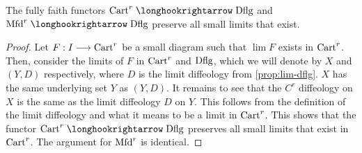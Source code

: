 \documentclass[11pt]{amsart}
\begin{document}
\begin{prop}\label{prop:lim-pres-Cr-Mfdr-Dflg}
The fully faith functors $\Cart^r \hto \Dflg$ and $\Mfd^r \hto \Dflg$
preserve all small limits that exist.
\end{prop}
\begin{proof}
Let $F : I \to \Cart^r$ be a small diagram such that $\lim F$ exists in $\mathrm{Cart}^r$.
Then, consider the limits of $F$ in $\mathrm{Cart}^r$ and $\mathrm{Dflg}$, which we will denote by
$X$ and $(Y, D)$ respectively, where $D$ is the limit diffeology from \cref{prop:lim-dflg}.
$X$ has the same underlying set $Y$ as $(Y, D)$. It remains to see that the $C^r$ diffeology on $X$
is the same as the limit diffeology $D$ on $Y$. This follows from the definition of the limit
diffeology and what it means to be a limit in $\mathrm{Cart}^r$. This shows that the functor
$\Cart^r \hto \Dflg$ preserves all small limits that exist in $\mathrm{Cart}^r$. The argument for
$\mathrm{Mfd}^r$ is identical.
\end{proof}
\end{document}
